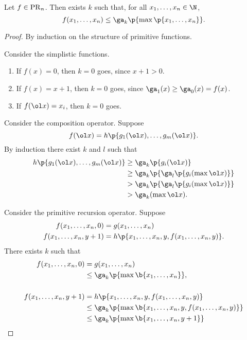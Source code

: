 \begin{lemma}
  Let $f \in \operatorname{PR}_n$. Then exists $k$ such that, for all $x_1, \dots, x_n \in \N$,
  $$ f(x_1, \dots, x_n) \le \ga_k\p{\max\p{x_1, \dots, x_n}}. $$
\end{lemma}

\begin{proof}
  By induction on the structure of primitive functions.
  
  Consider the simplistic functions.
  \begin{enumerate}
    \item If $f(x) = 0$, then $k = 0$ goes, since $x+1 > 0$.
    \item If $f(x) = x+1$, then $k = 0$ goes, since $\ga_1(x) \ge \ga_0(x) = f(x)$.
    \item If $f(\ol x) = x_i$, then $k = 0$ goes.
  \end{enumerate}
  
  Consider the composition operator.
  Suppose
  $$ f(\ol x) = h\p{g_1(\ol x), \dots, g_m(\ol x)}. $$
  By induction there exist $k$ and $l$ such that
  \begin{align*}
    h\p{g_1(\ol x), \dots, g_m(\ol x)}
    &\ge \ga_k\p{ g_i(\ol x)} \\
    &\ge \ga_k\p{\ga_l \p{g_i(\max \ol x)}} \\
    &> \ga_k\p{\ga_l \p{g_i(\max \ol x)}} \\
    &> \ga_k(\max \ol x).
  \end{align*}
  
  Consider the primitive recursion operator.
  Suppose 
  \begin{align*}
    f(x_1, \dots, x_n, 0) &= g(x_1, \dots, x_n) \\
    f(x_1, \dots, x_n, y+1) &= h\p{x_1, \dots, x_n, y, f(x_1, \dots, x_n, y)}.
  \end{align*}
  There exists $k$ such that
  \begin{align*}
    f(x_1, \dots, x_n, 0)
    &= g(x_1, \dots, x_n) \\
    &\le \ga_k\p{\max\b{x_1, \dots, x_n}}, \\
    \\ 
    f(x_1, \dots, x_n, y+1)
    &= h\p{x_1, \dots, x_n, y, f(x_1, \dots, x_n, y)} \\
    &\le \ga_k\p{\max\b{x_1, \dots, x_n, y, f(x_1, \dots, x_n, y)}} \\
    &\le \ga_k\p{\max\b{x_1, \dots, x_n, y+1}}
  \end{align*}
\end{proof}

